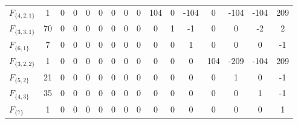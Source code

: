 \begin{table}[h]
\begin{tabular}{lccccccccccccccc}
      $F_{\{4,2,1\}}$ &       1 &            0 &            0 &              0 &            0 &              0 &            0 &                0 &            104 &              0 &         -104 &                0 &           -104 &           -104 &          209 \\
      $F_{\{3,3,1\}}$ &      70 &            0 &            0 &              0 &            0 &              0 &            0 &                0 &              0 &              1 &           -1 &                0 &              0 &             -2 &            2 \\
        $F_{\{6,1\}}$ &       7 &            0 &            0 &              0 &            0 &              0 &            0 &                0 &              0 &              0 &            1 &                0 &              0 &              0 &           -1 \\
      $F_{\{3,2,2\}}$ &       1 &            0 &            0 &              0 &            0 &              0 &            0 &                0 &              0 &              0 &            0 &              104 &           -209 &           -104 &          209 \\
        $F_{\{5,2\}}$ &      21 &            0 &            0 &              0 &            0 &              0 &            0 &                0 &              0 &              0 &            0 &                0 &              1 &              0 &           -1 \\
        $F_{\{4,3\}}$ &      35 &            0 &            0 &              0 &            0 &              0 &            0 &                0 &              0 &              0 &            0 &                0 &              0 &              1 &           -1 \\
          $F_{\{7\}}$ &       1 &            0 &            0 &              0 &            0 &              0 &            0 &                0 &              0 &              0 &            0 &                0 &              0 &              0 &            1 \\
\bottomrule
\end{tabular}
\end{table}

